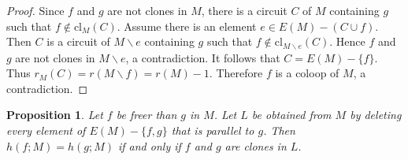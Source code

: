 \documentclass[12pt,reqno]{amsart}
\newtheorem{proposition}[theorem]{Proposition}
\theoremstyle{definition}
\theoremstyle{remark}
\numberwithin{equation}{section}
\newcommand{\del}{\backslash}
\newcommand{\cl}{\text{cl}}
\begin{document}
\begin{proof}
            Since $f$ and $g$ are not clones in $M$, there is a circuit $C$ of $M$ containing $g$ such that $f\not\in \cl_M(C)$.  
            Assume there is an element $e\in E(M)-(C\cup f)$.
            Then $C$ is a circuit of $M\del e$ containing $g$ such that $f\not\in \cl_{M\del e}(C)$. 
            Hence $f$ and $g$ are not clones in $M\del e$, a contradiction. 
            It follows that $C=E(M)-\{f\}$. Thus $r_M(C)=r(M\del f)=r(M)-1$. Therefore $f$ is a coloop of $M$, a contradiction.   
        \end{proof} 

\begin{proposition}\label{hypclones}
    Let $f$ be freer than $g$ in $M$. Let $L$ be obtained from $M$ by deleting every element of $E(M)-\{f,g\}$ that is parallel to $g$. Then $h(f;M)=h(g;M)$ if and only if $f$ and $g$ are clones in $L$. 
\end{proposition}
\end{document}
